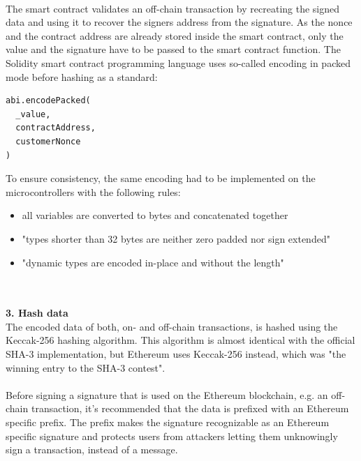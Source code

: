 \leavevmode
\\
The smart contract validates an off-chain transaction by recreating the signed data and using it to recover the signers address from the signature.
As the nonce and the contract address are already stored inside the smart contract, only the value and the signature have to be passed to the smart contract function.
The Solidity smart contract programming language uses so-called encoding in packed mode before hashing as a standard\cite{packed-spec}:
\\
\begin{lstlisting}[language=Solidity, numbers=none]
abi.encodePacked(
  _value,
  contractAddress,
  customerNonce
)
\end{lstlisting}
\leavevmode
\newpage
To ensure consistency, the same encoding had to be implemented on the microcontrollers with the following rules:
\begin{itemize}
  \item all variables are converted to bytes and concatenated together
  \item "types shorter than 32 bytes are neither zero padded nor sign extended"\cite{packed-spec}
  \item "dynamic types are encoded in-place and without the length"\cite{packed-spec}
\end{itemize}
\leavevmode
\\\\
\textbf{3. Hash data}\\
The encoded data of both, on- and off-chain transactions, is hashed using the Keccak-256 hashing algorithm.
This algorithm is almost identical with the official SHA-3 implementation, but Ethereum uses Keccak-256 instead, which was "the winning entry to the SHA-3 contest"\cite{ethereum-yellow-paper}.
\\\\
Before signing a signature that is used on the Ethereum blockchain, e.g. an off-chain transaction, it's recommended that the data is prefixed with an Ethereum specific prefix\cite{prefix}.
The prefix makes the signature recognizable as an Ethereum specific signature and protects users from attackers letting them unknowingly sign a transaction, instead of a message.

